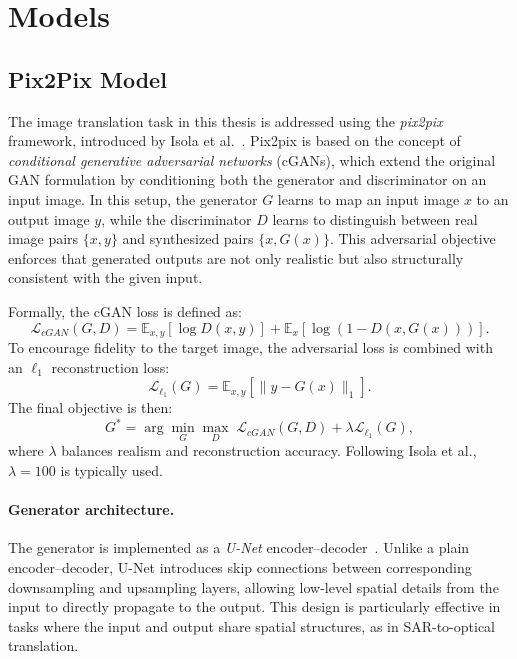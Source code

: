 \section{Models}
\subsection{Pix2Pix Model}
The image translation task in this thesis is addressed using the \textit{pix2pix} framework, introduced by Isola et al.~\cite{pix2pix_2018}. Pix2pix is based on the concept of \textit{conditional generative adversarial networks} (cGANs), which extend the original GAN formulation by conditioning both the generator and discriminator on an input image. In this setup, the generator $G$ learns to map an input image $x$ to an output image $y$, while the discriminator $D$ learns to distinguish between real image pairs $\{x, y\}$ and synthesized pairs $\{x, G(x)\}$. This adversarial objective enforces that generated outputs are not only realistic but also structurally consistent with the given input.

Formally, the cGAN loss is defined as:
\begin{equation}
    \mathcal{L}_{cGAN}(G,D) = \mathbb{E}_{x,y}[\log D(x,y)] + \mathbb{E}_{x}[\log(1 - D(x,G(x)))].
\end{equation}
To encourage fidelity to the target image, the adversarial loss is combined with an $\ell_{1}$ reconstruction loss:
\begin{equation}
    \mathcal{L}_{\ell_1}(G) = \mathbb{E}_{x,y}[\|y - G(x)\|_1].
\end{equation}
The final objective is then:
\begin{equation}
    G^* = \arg \min_G \max_D \; \mathcal{L}_{cGAN}(G,D) + \lambda \mathcal{L}_{\ell_1}(G),
\end{equation}
where $\lambda$ balances realism and reconstruction accuracy. Following Isola et al., $\lambda = 100$ is typically used.

\paragraph{Generator architecture.}  
The generator is implemented as a \textit{U-Net} encoder–decoder~\cite{U-net_2015}. Unlike a plain encoder–decoder, U-Net introduces skip connections between corresponding downsampling and upsampling layers, allowing low-level spatial details from the input to directly propagate to the output. This design is particularly effective in tasks where the input and output share spatial structures, as in SAR-to-optical translation.

